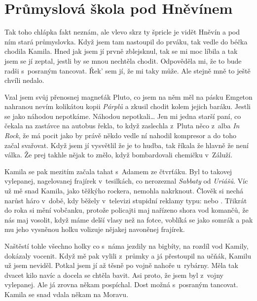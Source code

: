 
\chapter{Průmyslová škola pod Hněvínem}

Tak toho chlápka fakt neznám, ale vlevo skrz ty špricle je vidět
Hněvín a pod ním stará průmyslovka. Když jsem tam nastoupil do prváku,
tak vedle do béčka chodila Kamila. Hned jak jsem jí prvně zblejsknul,
tak se mi moc líbila a tak jsem se jí zeptal, jestli by se mnou
nechtěla chodit. Odpověděla mi, že to bude radši s~posraným tancovat.
Řek' sem jí, že mi taky může. Ale stejně mně to ještě chvíli nedalo.

Vzal jsem svůj přenosnej magneťák Pluto, co jsem na něm měl na pásku Emgeton
nahranou nevím kolikátou kopii {\em Párplů} a zkusil chodit kolem jejich
baráku. Jestli se jako náhodou nepotkáme. Náhodou nepotkali\dots{} Jen mi jedna
starší paní, co čekala na zastávce na autobus řekla, to když zaslechla z~Pluta
něco z~alba {\em In Rock}, že má pocit jako by právě někdo vedle ní nahodil
kompresor a do toho začal svařovat. Když jsem jí vysvětlil že je to hudba, tak
říkala že hlavně že není válka. Že prej takhle nějak to znělo, když
bombardovali chemičku v~Záluží.

Kamila se pak mezitím začala tahat s~Adamem ze čtvrťáku. Byl to takovej
vylepanej, nagelovanej frajírek v~tesilkách, co nerozeznal {\em Sabbaty} od
{\em Uriášů}. Víc už mě snad Kamila, jako těžkýho rockera, nemohla nakrknout.
Člověk si nechá narůst háro v~době, kdy běžely v~televizi stupidní reklamy
typu:  nebo . Třikrát do roka si mění vobčanku, protože policajti maj
nařízeno shora vod komančů, že nás maj vosolit, když máme delší vlasy než na
fotce, voblíká se jako somrák a pak mu jeho vysněnou holku volizuje nějakej
navoněnej frajírek.

Naštěstí tohle všechno holky co s~náma jezdily na bigbíty, na rozdíl vod
Kamily, dokázaly vocenit. Když mě pak vylili z~průmky a já přestoupil na učňák,
Kamilu už jsem neviděl. Potkal jsem jí až těsně po vojně nahoře u~rybárny. Měla
tak dvacet kilo navíc a docela se chtěla bavit. Asi proto, že jsem byl z~vojny
vylepanej. Ale já zrovna někam pospíchal. Dost možná s~posraným tancovat.
Kamila se snad vdala někam na Moravu.

